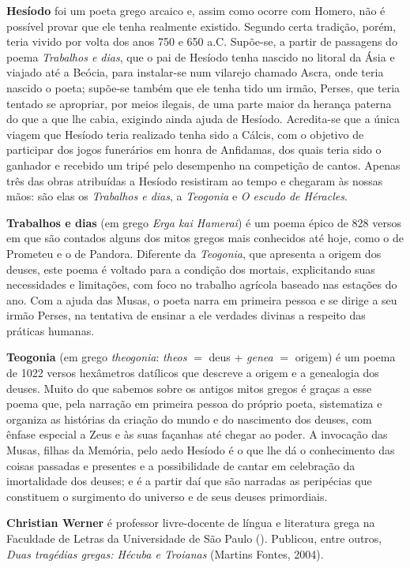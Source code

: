 \textbf{Hesíodo} foi um poeta grego arcaico e, assim como ocorre com Homero, não é possível provar que ele tenha realmente existido. Segundo certa tradição, porém, teria vivido por volta dos anos 750 e 650 a.C.  Supõe-se, a partir de passagens do poema \textit{Trabalhos e dias}, que o pai de Hesíodo tenha nascido no litoral da Ásia e viajado até a Beócia, para instalar-se num vilarejo chamado Ascra, onde teria nascido o poeta; supõe-se também que ele tenha tido um irmão, Perses, que teria tentado se apropriar, por meios ilegais, de uma parte maior da herança paterna do que a que lhe cabia, exigindo ainda ajuda de Hesíodo. Acredita-se que a única viagem que Hesíodo teria realizado tenha sido a Cálcis, com o objetivo de participar dos jogos funerários em honra de Anfidamas, dos quais teria sido o ganhador e recebido um tripé pelo desempenho na competição de cantos. Apenas três das obras atribuídas a Hesíodo resistiram ao tempo e chegaram às nossas mãos: são elas os \textit{Trabalhos e dias}, a \textit{Teogonia} e \textit{O escudo de Héracles}.

\textbf{Trabalhos e dias} (em grego \textit{Erga kai Hamerai}) é um poema épico de 828 versos em que são contados alguns dos mitos gregos mais conhecidos até hoje, como o de Prometeu e o de Pandora. Diferente da \textit{Teogonia}, que apresenta a origem dos deuses, este poema é voltado para a condição dos mortais, explicitando suas necessidades e limitações, com foco no trabalho agrícola baseado nas estações do ano. Com a ajuda das Musas, o poeta narra em primeira pessoa e se dirige a seu irmão Perses, na tentativa de ensinar a ele verdades divinas a respeito das práticas humanas.

\textbf{Teogonia} (em grego \textit{theogonia}: \textit{theos} $=$ deus +
\textit{genea} $=$ origem) é um poema de 1022 versos hexâmetros datílicos que
descreve a origem e a genealogia dos deuses. Muito do que sabemos sobre os
antigos mitos gregos é graças a esse poema que, pela narração em primeira
pessoa do próprio poeta, sistematiza e organiza as histórias da criação do
mundo e do nascimento dos deuses, com ênfase especial a Zeus e às suas façanhas até chegar ao poder. A invocação das Musas, filhas da Memória, pelo aedo Hesíodo é o que lhe dá o conhecimento das coisas passadas e presentes e a possibilidade de cantar em celebração da imortalidade dos deuses; e é a partir daí que são narradas as peripécias que constituem o surgimento do universo e de seus deuses primordiais.  

\textbf{Christian Werner} é professor livre-docente de língua e literatura grega na Faculdade de Letras da Universidade de São Paulo (). Publicou, entre outros, \textit{Duas tragédias gregas: Hécuba e Troianas} (Martins Fontes, 2004).







